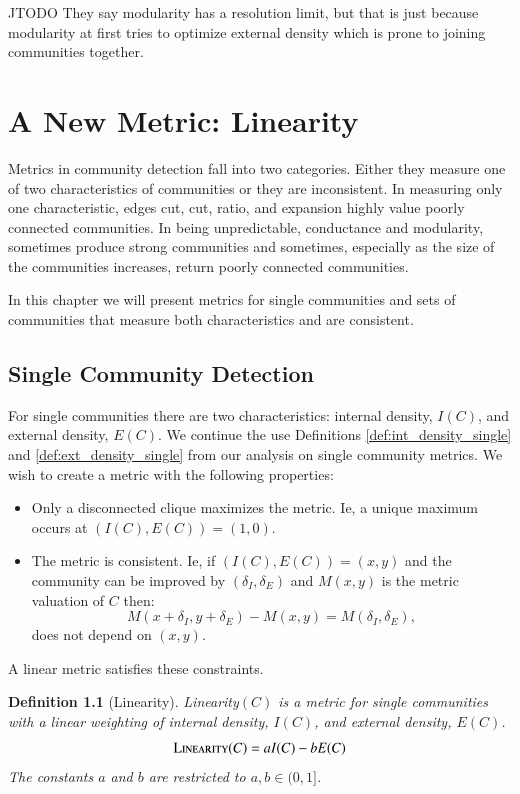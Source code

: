 \documentclass[phd,tocprelim]{cornell}
\newtheorem{definition}{Definition}
\begin{document}
JTODO They say modularity has a resolution limit, but that is just because modularity at first tries to optimize external density which is prone to joining communities together. \cite{JTODO}






\chapter{A New Metric: Linearity}

Metrics in community detection fall into two categories.  Either they measure one of two characteristics of communities or they are inconsistent.  In measuring only one characteristic, edges cut, cut, ratio, and expansion highly value poorly connected communities.  In being unpredictable, conductance and modularity, sometimes produce strong communities and sometimes, especially as the size of the communities increases, return poorly connected communities\cite{JTODO}.

In this chapter we will present metrics for single communities and sets of communities that measure both characteristics and are consistent.


\section{Single Community Detection}

For single communities there are two characteristics: internal density, $I(C)$, and external density, $E(C)$.  We continue the use Definitions \ref{def:int_density_single} and \ref{def:ext_density_single} from our analysis on single community metrics.  We wish to create a metric with the following properties:
\begin{itemize}
\item Only a disconnected clique maximizes the metric.  Ie, a unique maximum occurs at $(I(C), E(C)) = (1, 0)$.
\item The metric is consistent. Ie, if $(I(C), E(C)) = (x,y)$ and the community can be improved by $(\delta_I, \delta_E)$ and $M(x, y)$ is the metric valuation of $C$ then:
 \begin{equation}
M(x+\delta_I, y + \delta_E) - M(x,y) = M(\delta_I, \delta_E),
\end{equation}
does not depend on $(x,y)$.
\end{itemize}
A linear metric satisfies these constraints.
\begin{definition}[Linearity] {\sc Linearity}$(C)$ is a metric for single communities with a linear weighting of internal density, $I(C)$, and external density, $E(C)$.
  \begin{equation}
   \mbox{\sc Linearity} (C) = a I(C) - b E(C)
  \end{equation}
The constants $a$ and $b$ are restricted to $a, b \in (0,1]$.
\end{definition}
\end{document}

